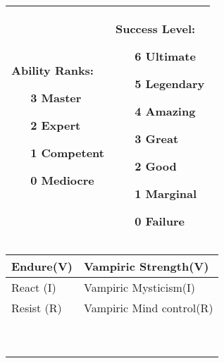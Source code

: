 \documentclass[a4paper, 12pt, finnish]{report}
\begin{document}
{\scriptsize
\begin{tabularx}{\columnwidth}{|X|X|} \hline
    {\small Ability Ranks:}
    \begin{itemize}[leftmargin=10pt] \setlength\itemsep{-2pt}
    \item[3] Master
    \item[2] Expert
    \item[1] Competent
    \item[0] Mediocre
\end{itemize} &
    {\small Success Level:}
    \begin{itemize}[leftmargin=10pt] \setlength\itemsep{-2pt}
    \item[6] Ultimate
    \item[5] Legendary
    \item[4] Amazing
    \item[3] Great
    \item[2] Good
    \item[1] Marginal
    \item[0] Failure
\end{itemize} \\ \hline 
\end{tabularx}
}

\begin{tabular}{|p{4cm}|p{4cm}|} \hline
    Endure(V) & Vampiric \newline Strength(V) \\ \hline
    React (I) & Vampiric \newline Mysticism(I) \\ \hline
    Resist (R) & Vampiric \newline Mind control(R) \\ \hline
     & \\[15pt] \hline
     & \\[15pt] \hline
     & \\[15pt] \hline
     & \\[15pt] \hline
     & \\[15pt] \hline
     & \\[15pt] \hline
     & \\[15pt] \hline
     & \\[15pt] \hline
     & \\[15pt] \hline
\end{tabular}
\end{document}
